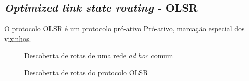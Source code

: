 \subsection{\textit{Optimized link state routing} - OLSR}
O protocolo OLSR \'e um protocolo pr\'o-ativo
Pr\'o-ativo, marca\c{c}\~ao especial dos vizinhos.

\begin{figure}[H]
	\centering
	\label{subfig:olsrStep11}
	\label{subfig:olsrStep12}
	\label{subfig:olsrStep13}
	\label{subfig:olsrStep14}	
	\caption{Descoberta de rotas de uma rede \textit{ad hoc} comum}
	\label{fig:olsrComum}
\end{figure}

\begin{figure}[H]
	\centering
	\label{subfig:olsrStep21}
	\label{subfig:olsrStep22}
	\label{subfig:olsrStep23}
	\label{subfig:olsrStep24}	
	\caption{Descoberta de rotas do protocolo OLSR}
	\label{fig:olsrOperation}
\end{figure}
